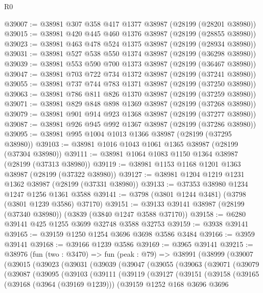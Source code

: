 \begin{lexlean}{R0}
\begin{coremodule}
@39007 := @38981 @307 @358 @417 @1377 @38987 (@28199 (@28201 @38980))
@39015 := @38981 @420 @445 @460 @1376 @38987 (@28199 (@28855 @38980))
@39023 := @38981 @463 @478 @524 @1375 @38987 (@28199 (@28934 @38980))
@39031 := @38981 @527 @538 @550 @1374 @38987 (@28199 (@36298 @38980))
@39039 := @38981 @553 @590 @700 @1373 @38987 (@28199 (@36467 @38980))
@39047 := @38981 @703 @722 @734 @1372 @38987 (@28199 (@37241 @38980))
@39055 := @38981 @737 @744 @783 @1371 @38987 (@28199 (@37250 @38980))
@39063 := @38981 @786 @811 @826 @1370 @38987 (@28199 (@37259 @38980))
@39071 := @38981 @829 @848 @898 @1369 @38987 (@28199 (@37268 @38980))
@39079 := @38981 @901 @914 @923 @1368 @38987 (@28199 (@37277 @38980))
@39087 := @38981 @926 @945 @992 @1367 @38987 (@28199 (@37286 @38980))
@39095 := @38981 @995 @1004 @1013 @1366 @38987 (@28199 (@37295 @38980))
@39103 := @38981 @1016 @1043 @1061 @1365 @38987 (@28199 (@37304 @38980))
@39111 := @38981 @1064 @1083 @1150 @1364 @38987 (@28199 (@37313 @38980))
@39119 := @38981 @1153 @1168 @1201 @1363 @38987 (@28199 (@37322 @38980))
@39127 := @38981 @1204 @1219 @1231 @1362 @38987 (@28199 (@37331 @38980))
@39133 := @37353 @38980 @1234 @1247 @1256 @1361 @3588
@39141 := @3798 (@3801 @1244 @3481) (@3798 (@3801 @1239 @3586) @37170)
@39151 := @39133 @39141 @38987 (@28199 (@37340 @38980)) (@3839 (@3840 @1247 @3588 @37170))
@39158 := @6280 @39141 @425 @1255 @3699 @32748 @3588 @32753
@39159 := @3938 @39141
@39165 := @39159 @1250 @1254 @3696 @3698 @3586 @3484
@39166 := @3959 @39141
@39168 := @39166 @1239 @3586
@39169 := @3965 @39141
@39215 := @38976
    (fun (two : @3470) =>
    fun (peak : @79) =>
    @38991
      (@38999
        (@39007
          (@39015
            (@39023
              (@39031
                (@39039
                  (@39047
                    (@39055
                      (@39063
                        (@39071
                          (@39079
                            (@39087
                              (@39095
                                (@39103
                                  (@39111
                                    (@39119
                                      (@39127
                                        (@39151
                                          (@39158
                                            (@39165
                                              (@39168 (@3964 (@39169 @1239)))
                                              (@39159
                                                @1252
                                                @168
                                                @3696
                                                @3696

\end{coremodule}
\end{lexlean}
